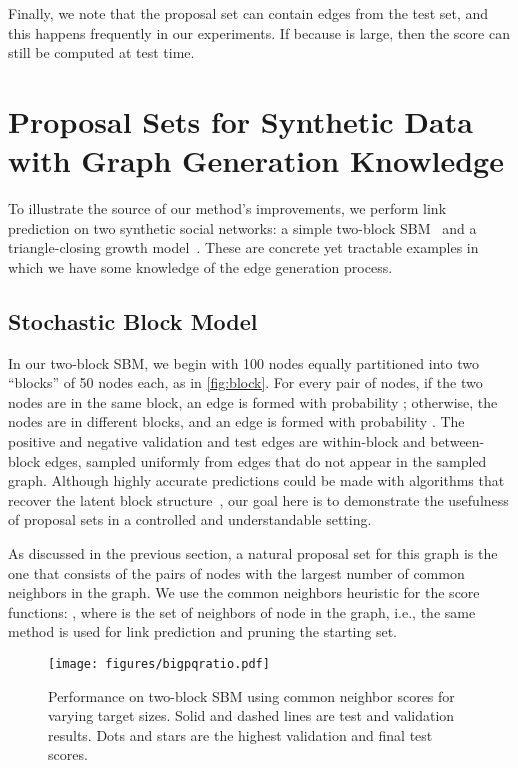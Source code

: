 \documentclass{article}
\begin{document}
Finally, we note that the proposal set can contain edges from the test set, and this happens frequently in our experiments.
If  because  is large, then the score  can still be computed at test time.


\section{Proposal Sets for Synthetic Data with Graph Generation Knowledge}\label{sec:knowledge}

To illustrate the source of our method's improvements, we perform link prediction on two synthetic social networks:
a simple two-block SBM~\cite{holland1983stochastic} and a triangle-closing growth model~\cite{Jin2001StructureOG}.
These are concrete yet tractable examples in which we have some knowledge of the edge generation process. 

\subsection{Stochastic Block Model} \label{sec:sbm}
In our two-block SBM, we begin with 100 nodes equally partitioned into two ``blocks'' of 50 nodes each, as in \cref{fig:block}.
For every pair of nodes, if the two nodes are in the same block, an edge is formed with probability ;
otherwise, the nodes are in different blocks, and an edge is formed with probability .
The positive and negative validation and test edges are within-block and between-block edges,
sampled uniformly from edges that do not appear in the sampled graph.
Although highly accurate predictions could be made with algorithms that recover the latent block structure~\cite{abbe2017community},
our goal here is to demonstrate the usefulness of proposal sets in a controlled and understandable setting.

As discussed in the previous section, a natural proposal set  for this graph
is the one that consists of the  pairs of nodes with the largest number of common neighbors in the graph.
We use the common neighbors heuristic for the score functions:
, where  is the set of neighbors of node  in the graph,
i.e., the same method is used for link prediction and pruning the starting set.
\begin{wrapfigure}[19]{R}{0.55\linewidth}
    \centering
    \texttt{[image: figures/bigpqratio.pdf]}
    \vspace{-7mm}
    \caption{Performance on two-block SBM using common neighbor scores for varying target sizes. 
    Solid and dashed lines are test and validation results. Dots and stars are the highest validation and final test scores.
    }
    \label{fig:pqratio}
\end{wrapfigure}
\end{document}
